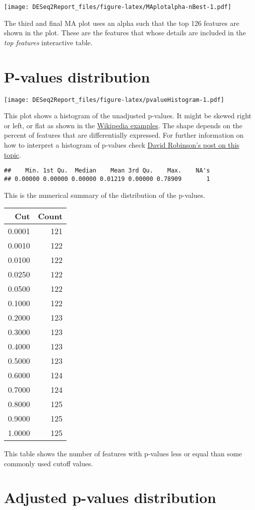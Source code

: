 \documentclass[]{article}
\begin{document}
\texttt{[image: DESeq2Report\_files/figure-latex/MAplotalpha-nBest-1.pdf]}

The third and final MA plot uses an alpha such that the top 126 features
are shown in the plot. These are the features that whose details are
included in the \emph{top features} interactive table.

\section{P-values distribution}\label{p-values-distribution}

\texttt{[image: DESeq2Report\_files/figure-latex/pvalueHistogram-1.pdf]}

This plot shows a histogram of the unadjusted p-values. It might be
skewed right or left, or flat as shown in the
\href{https://en.wikipedia.org/wiki/Histogram\#Examples}{Wikipedia
examples}. The shape depends on the percent of features that are
differentially expressed. For further information on how to interpret a
histogram of p-values check
\href{http://varianceexplained.org/statistics/interpreting-pvalue-histogram/}{David
Robinson's post on this topic}.

\begin{verbatim}
##    Min. 1st Qu.  Median    Mean 3rd Qu.    Max.    NA's 
## 0.00000 0.00000 0.00000 0.01219 0.00000 0.78909       1
\end{verbatim}

This is the numerical summary of the distribution of the p-values.

\begin{longtable}[]{@{}rr@{}}
\toprule
Cut & Count\tabularnewline
\midrule
\endhead
0.0001 & 121\tabularnewline
0.0010 & 122\tabularnewline
0.0100 & 122\tabularnewline
0.0250 & 122\tabularnewline
0.0500 & 122\tabularnewline
0.1000 & 122\tabularnewline
0.2000 & 123\tabularnewline
0.3000 & 123\tabularnewline
0.4000 & 123\tabularnewline
0.5000 & 123\tabularnewline
0.6000 & 124\tabularnewline
0.7000 & 124\tabularnewline
0.8000 & 125\tabularnewline
0.9000 & 125\tabularnewline
1.0000 & 125\tabularnewline
\bottomrule
\end{longtable}

This table shows the number of features with p-values less or equal than
some commonly used cutoff values.

\section{Adjusted p-values
distribution}\label{adjusted-p-values-distribution}
\end{document}
